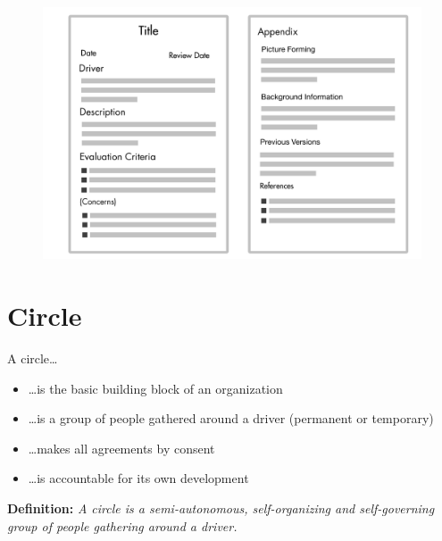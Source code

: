 \begin{figure}[htbp]
\centering
\includegraphics[keepaspectratio,width=\textwidth,height=0.75\textheight]{img/agreements/agreement-template.png}
\end{figure}

\section{Circle}
\label{circle}

A circle{\ldots}

\begin{itemize}
\item {\ldots}is the basic building block of an organization

\item {\ldots}is a group of people gathered around a driver (permanent or temporary)

\item {\ldots}makes all agreements by consent

\item {\ldots}is accountable for its own development

\end{itemize}

\textbf{Definition:} \emph{A circle is a semi-autonomous, self-organizing and self-governing group of people gathering around a driver.}

